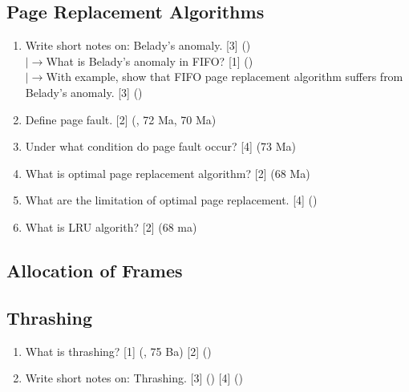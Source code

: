 \documentclass[12pt]{article}
\newcommand{\lb}{\\$\left|\rightarrow\right.$}
\begin{document}
	\subsection{Page Replacement Algorithms}
		\begin{enumerate}
			\item Write short notes on: Belady's anomaly. \hfill [3] ()
			\lb What is Belady's anomaly in FIFO? \hfill [1] ()
			\lb With example, show that FIFO page replacement algorithm suffers from Belady's anomaly. \hfill [3] ()

			\item Define page fault. \hfill [2] (, 72 Ma, 70 Ma)

			\item Under what condition do page fault occur? \hfill [4] (73 Ma)

			\item What is optimal page replacement algorithm? \hfill [2] (68 Ma)

			\item What are the limitation of optimal page replacement. \hfill [4] ()

			\item What is LRU algorith? \hfill [2] (68 ma)
		\end{enumerate}

	\subsection{Allocation of Frames}
	\subsection{Thrashing}
		\begin{enumerate}
			\item What is thrashing? \hfill [1] (, 75 Ba) [2] ()

			\item Write short notes on: Thrashing. \hfill [3] () [4] ()
		\end{enumerate}
\end{document}
